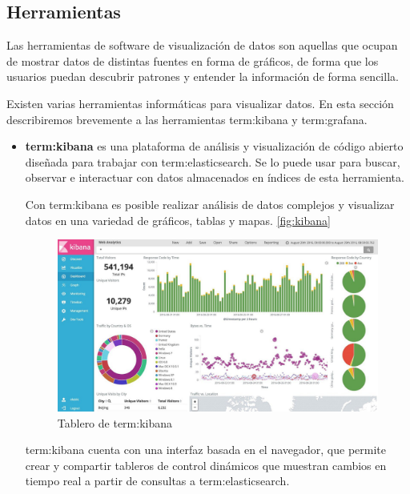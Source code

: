 \subsection{Herramientas}
\label{herramientas-de-visualizacion}

Las herramientas de software de visualización de datos son aquellas que ocupan
de mostrar datos de distintas fuentes en forma de gráficos, de forma que los
usuarios puedan descubrir patrones y entender la información de forma sencilla.

Existen varias herramientas informáticas para visualizar datos. En esta sección
describiremos brevemente a las herramientas \gls{term:kibana} y
\gls{term:grafana}.

\begin{itemize}
   
\item
\textbf{\gls{term:kibana}} es una plataforma de análisis y visualización de código
abierto diseñada para trabajar con \gls{term:elasticsearch}. Se lo puede usar
para buscar, observar e interactuar con datos almacenados en índices de esta herramienta.

Con \gls{term:kibana} es posible realizar análisis de datos complejos y
visualizar datos en una variedad de gráficos, tablas y mapas.
\autoref{fig:kibana}

\begin{figure}
  \includegraphics[width=\linewidth]{src/images/05-capitulo-5/kibana.jpg}
  \caption{Tablero de \gls{term:kibana}}
  \label{fig:kibana}
\end{figure}

\gls{term:kibana} cuenta con una interfaz basada en el navegador, que permite
crear y compartir tableros de control dinámicos que muestran cambios en tiempo real
a partir de consultas a \gls{term:elasticsearch}.


\end{itemize}
